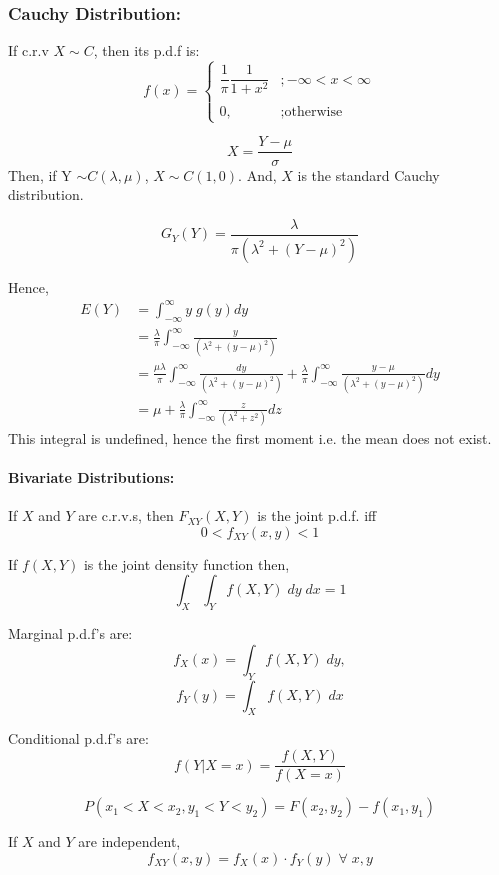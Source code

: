 \documentclass[
10pt, %
a4paper, %
]{report}
\begin{document}
\subsubsection*{Cauchy Distribution:}
If c.r.v \(X\sim C\), then its p.d.f is:
\[
    f(x)= 
\begin{cases}
    \dfrac{1}{\pi} \dfrac{1}{1+x^2}        & {;-\infty<x<\infty} \\\\
    0,                                     & ;\text{otherwise}
\end{cases}
\]

\[
X = \frac{Y-\mu}{\sigma}
\]
Then, if Y \(\sim C(\lambda, \mu)\), \(X\sim C(1, 0)\).
And, \(X\) is the standard Cauchy distribution.

\[
G_Y(Y) = \frac{\lambda}{\pi(\lambda^2+(Y-\mu)^2)}
\]

Hence,
\begin{align*}
    E(Y) &= \int_{-\infty}^{\infty} y \; g(y) dy \\
         &= \frac{\lambda}{\pi} \int_{-\infty}^{\infty} \frac{y}{(\lambda^2+(y-\mu)^2)} \\
         &= \frac{\mu\lambda}{\pi} \int_{-\infty}^{\infty} \frac{dy}{(\lambda^2+(y-\mu)^2)} + \frac{\lambda}{\pi} \int_{-\infty}^{\infty} \frac{y-\mu}{(\lambda^2+(y-\mu)^2)}dy \\
         &= \mu +  \frac{\lambda}{\pi} \int_{-\infty}^{\infty} \frac{z}{(\lambda^2+z^2)}dz
\end{align*}
This integral is undefined, hence the first moment i.e. the mean does not exist.



\newpage
\paragraph{Bivariate Distributions:}
If \(X\) and \(Y\) are c.r.v.s, then \(F_{XY}(X, Y)\) is the joint p.d.f. iff
\[
0 < f_{XY}(x, y) < 1
\]

If \(f(X, Y)\) is the joint density function then,
\[
\int_X \int_Y f(X, Y) \; dy \; dx = 1
\]

Marginal p.d.f's are:
\[
f_X(x) = \int_Y f(X, Y) \; dy,
\]
\[
f_Y(y) = \int_X f(X, Y) \; dx
\]

Conditional p.d.f's are:
\[
f(Y|X=x) = \frac{f(X, Y)}{f(X=x)}
\]

\[
P(x_1 < X < x_2, y_1 < Y < y_2) = F(x_2, y_2) - f(x_1, y_1)
\]

If \(X\) and \(Y\) are independent, 
\[
f_{XY}(x, y) = f_X(x) \cdot f_Y(y) \; \forall \; x, y
\]
\end{document}

